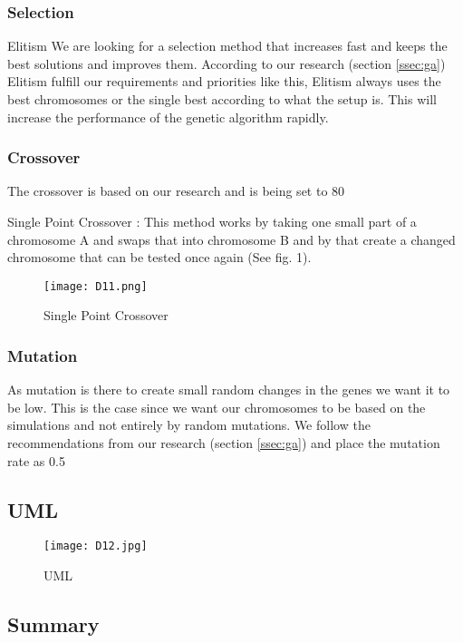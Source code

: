 \subsubsection{Selection}

Elitism
We are looking for a selection method that increases fast and keeps the best solutions and improves them. According to our research (section \ref{ssec:ga}) Elitism fulfill our requirements and priorities like this, Elitism always uses the best chromosomes or the single best according to what the setup is. This will increase the performance of the genetic algorithm rapidly.

\subsubsection{Crossover}
The crossover is based on our research and is being set to 80%

Single Point Crossover \cite{MarekOkbitko1998}:
This method works by taking one small part of a chromosome A and swaps that into chromosome B and by that create a changed chromosome that can be tested once again (See fig. 1).


\begin{figure}[!htbp]
\centering
\texttt{[image: D11.png]}
\caption{ Single Point Crossover }
\label{fig:Crossover}
\end{figure}


\subsubsection{Mutation}
As mutation is there to create small random changes in the genes we want it to be low. This is the case since we want our chromosomes to be based on the simulations and not entirely by random mutations. We follow the recommendations from our research (section \ref{ssec:ga}) and place the mutation rate as 0.5%

\subsection{UML}

\begin{figure}[!htbp]
\centering
\texttt{[image: D12.jpg]}
\caption{ UML }
\label{fig:UML}
\end{figure}

\subsection{Summary}

